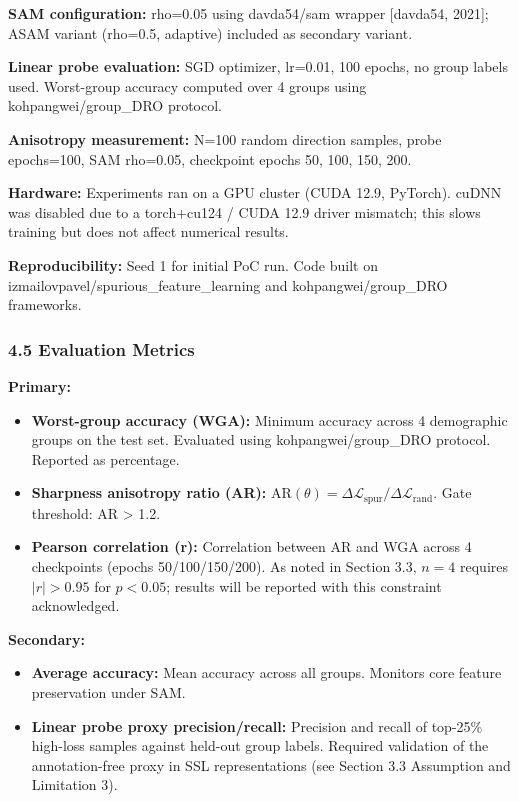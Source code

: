 \textbf{SAM configuration:} rho=0.05 using davda54/sam wrapper [davda54, 2021]; ASAM variant (rho=0.5, adaptive) included as secondary variant.

\textbf{Linear probe evaluation:} SGD optimizer, lr=0.01, 100 epochs, no group labels used. Worst-group accuracy computed over 4 groups using kohpangwei/group\_DRO protocol.

\textbf{Anisotropy measurement:} N=100 random direction samples, probe epochs=100, SAM rho=0.05, checkpoint epochs {50, 100, 150, 200}.

\textbf{Hardware:} Experiments ran on a GPU cluster (CUDA 12.9, PyTorch). cuDNN was disabled due to a torch+cu124 / CUDA 12.9 driver mismatch; this slows training but does not affect numerical results.

\textbf{Reproducibility:} Seed 1 for initial PoC run. Code built on izmailovpavel/spurious\_feature\_learning and kohpangwei/group\_DRO frameworks.

\subsubsection{4.5 Evaluation Metrics}

\textbf{Primary:}
\begin{itemize}
\item \textbf{Worst-group accuracy (WGA):} Minimum accuracy across 4 demographic groups on the test set. Evaluated using kohpangwei/group\_DRO protocol. Reported as percentage.
\item \textbf{Sharpness anisotropy ratio (AR):} $\text{AR}(\theta) = \Delta\mathcal{L}_{\text{spur}} / \Delta\mathcal{L}_{\text{rand}}$. Gate threshold: AR > 1.2.
\item \textbf{Pearson correlation (r):} Correlation between AR and WGA across 4 checkpoints (epochs 50/100/150/200). As noted in Section 3.3, $n=4$ requires $|r|>0.95$ for $p<0.05$; results will be reported with this constraint acknowledged.
\end{itemize}

\textbf{Secondary:}
\begin{itemize}
\item \textbf{Average accuracy:} Mean accuracy across all groups. Monitors core feature preservation under SAM.
\item \textbf{Linear probe proxy precision/recall:} Precision and recall of top-25\% high-loss samples against held-out group labels. Required validation of the annotation-free proxy in SSL representations (see Section 3.3 Assumption and Limitation 3).
\end{itemize}

